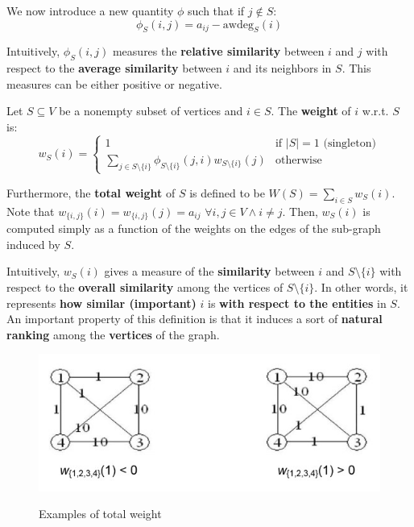 
We now introduce a new quantity $\phi$ such that if $j \notin S$:
\begin{equation}
  \phi_S(i, j)=a_{ij}-\text{awdeg}_S(i)
\end{equation}

Intuitively, $\phi_S(i, j)$ measures the \textbf{relative similarity} between $i$ and $j$ with respect to the \textbf{average similarity} between $i$ and its neighbors in $S$. This measures can be either positive or negative.

Let $S\subseteq V$ be a nonempty subset of vertices and $i \in S$. The \textbf{weight} of $i$ w.r.t. $S$ is:
\begin{equation}
  w_S(i)= \begin{cases}
      1 & \text{if } |S| = 1 \text{  (singleton)}\\
      \sum\limits_{j\in S\setminus \{i\}}\phi_{S\setminus \{i\}}(j, i)w_{S\setminus \{i\}}(j) & \text{otherwise}
  \end{cases}
\end{equation}

Furthermore, the \textbf{total weight} of $S$ is defined to be $W(S)=\sum_{i\in S}w_S(i)$.
Note that $w_{\{i, j\}}(i)=w_{\{i, j\}}(j)=a_{ij}$ $\forall i, j \in V \land i\neq j$. Then, $w_S(i)$ is computed simply as a function of the weights on the edges of the sub-graph induced by $S$.

Intuitively, $w_S(i)$ gives a measure of the \textbf{similarity} between $i$ and $S\setminus \{i\}$ with respect to the \textbf{overall similarity} among the vertices of $S\setminus \{i\}$. In other words, it represents \textbf{how similar (important)} $i$ is \textbf{with respect to the entities} in $S$. An important property of this definition is that it induces a sort of \textbf{natural ranking} among the \textbf{vertices} of the graph. 

\begin{figure}[h!]
		\centering
        \includegraphics[scale = 1.0]{img/total weight rxample.jpg}
		\label{mi}
        \caption{Examples of total weight}
\end{figure}

